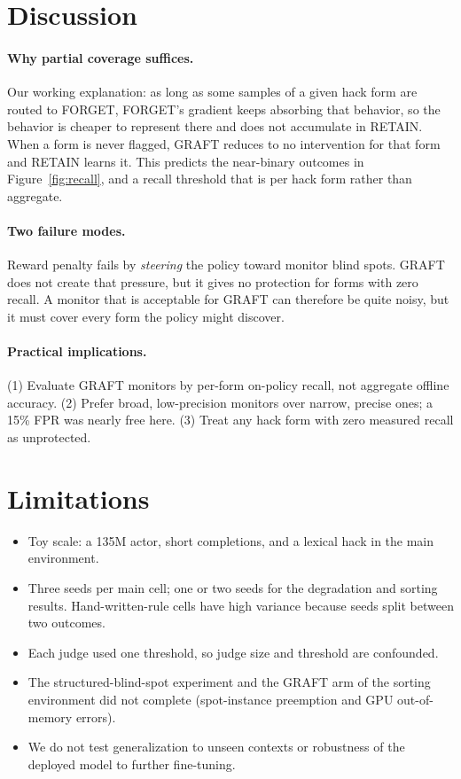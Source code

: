 \documentclass[11pt]{article}
\begin{document}
\section{Discussion}
\paragraph{Why partial coverage suffices.} Our working explanation: as long as some samples of a given hack form are routed to FORGET, FORGET's gradient keeps absorbing that behavior, so the behavior is cheaper to represent there and does not accumulate in RETAIN. When a form is never flagged, GRAFT reduces to no intervention for that form and RETAIN learns it. This predicts the near-binary outcomes in Figure~\ref{fig:recall}, and a recall threshold that is per hack form rather than aggregate.

\paragraph{Two failure modes.} Reward penalty fails by \emph{steering} the policy toward monitor blind spots. GRAFT does not create that pressure, but it gives no protection for forms with zero recall. A monitor that is acceptable for GRAFT can therefore be quite noisy, but it must cover every form the policy might discover.

\paragraph{Practical implications.} (1) Evaluate GRAFT monitors by per-form on-policy recall, not aggregate offline accuracy. (2) Prefer broad, low-precision monitors over narrow, precise ones; a 15\% FPR was nearly free here. (3) Treat any hack form with zero measured recall as unprotected.

\section{Limitations}\label{sec:limits}
\begin{itemize}
\item Toy scale: a 135M actor, short completions, and a lexical hack in the main environment.
\item Three seeds per main cell; one or two seeds for the degradation and sorting results. Hand-written-rule cells have high variance because seeds split between two outcomes.
\item Each judge used one threshold, so judge size and threshold are confounded.
\item The structured-blind-spot experiment and the GRAFT arm of the sorting environment did not complete (spot-instance preemption and GPU out-of-memory errors).
\item We do not test generalization to unseen contexts or robustness of the deployed model to further fine-tuning.
\end{itemize}
\end{document}

